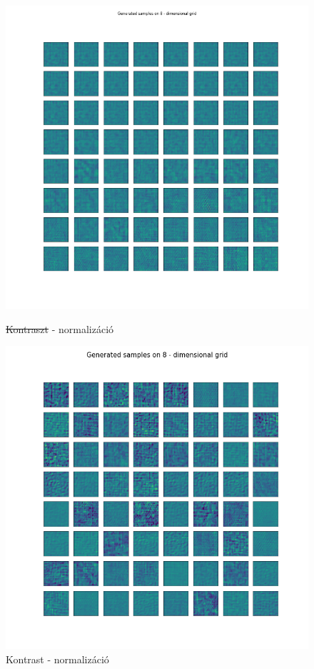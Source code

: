 \documentclass[12pt, english]{article}
\begin{document}
\begin{figure}[H]
\begin{minipage}{0.5\linewidth}
  \end{minipage} 
  \begin{minipage}{0.5\linewidth}
    \centering
    \includegraphics[width=.75\linewidth]{lvae2/18_DenseLadderVAE_contrastNorm-generated_samples.png} 
    \caption{\st{Kontraszt} - normalizáció} 
    \label{fig:lvae-2-contrast-generated-3} 
  \end{minipage}%
  \begin{minipage}{0.5\linewidth}
    \centering
    \includegraphics[width=.75\linewidth]{lvae2/19_DenseLadderVAE_contrastNorm_contrast-generated_samples.png} 
    \caption{Kontrast - normalizáció} 
    \label{fig:lvae-2-contrast-generated-4} 
  \end{minipage} 
\end{figure}
\end{document}
